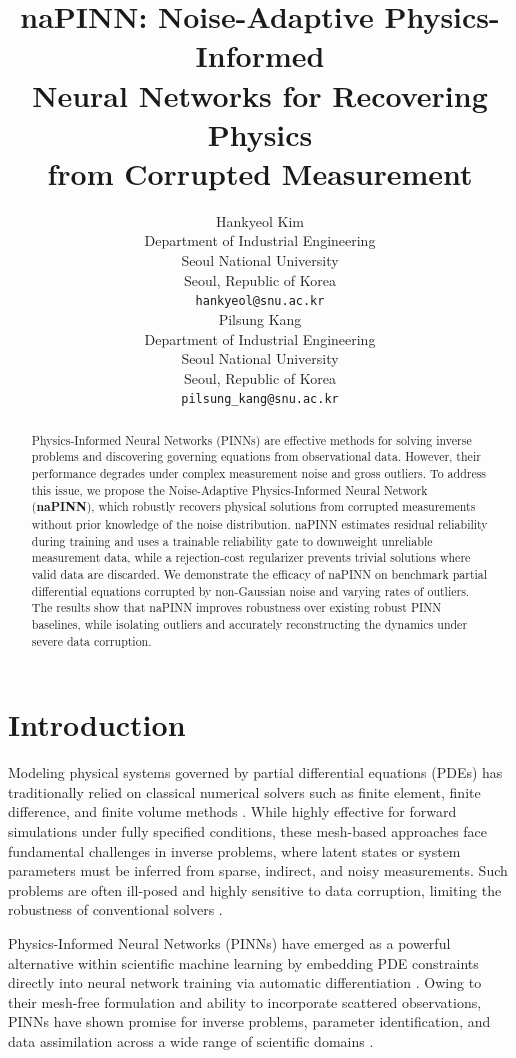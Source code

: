 \documentclass{article}
\title{naPINN: Noise-Adaptive Physics-Informed \\ Neural Networks for Recovering Physics \\ from Corrupted Measurement}
\author{%
  Hankyeol Kim \\
  Department of Industrial Engineering\\
  Seoul National University\\
  Seoul, Republic of Korea \\
  \texttt{hankyeol@snu.ac.kr} \\
  \And
  Pilsung Kang \\
Department of Industrial Engineering\\
  Seoul National University\\
  Seoul, Republic of Korea \\
  \texttt{pilsung_kang@snu.ac.kr} \\
}
\theoremstyle{plain}
\theoremstyle{definition}
\theoremstyle{remark}
\begin{document}
\maketitle

\begin{abstract}
    Physics-Informed Neural Networks (PINNs) are effective methods for solving inverse problems and discovering governing equations from observational data. However, their performance degrades under complex measurement noise and gross outliers. To address this issue, we propose the Noise-Adaptive Physics-Informed Neural Network (\textbf{naPINN}), which robustly recovers physical solutions from corrupted measurements without prior knowledge of the noise distribution. naPINN estimates residual reliability during training and uses a trainable reliability gate to downweight unreliable measurement data, while a rejection-cost regularizer prevents trivial solutions where valid data are discarded. We demonstrate the efficacy of naPINN on benchmark partial differential equations corrupted by non-Gaussian noise and varying rates of outliers. The results show that naPINN improves robustness over existing robust PINN baselines, while isolating outliers and accurately reconstructing the dynamics under severe data corruption.
\end{abstract}

\section{Introduction}
\label{sec:introduction}

Modeling physical systems governed by partial differential equations (PDEs) has traditionally relied on classical numerical solvers such as finite element, finite difference, and finite volume methods \cite{FEM-book, FDM-book}. While highly effective for forward simulations under fully specified conditions, these mesh-based approaches face fundamental challenges in inverse problems, where latent states or system parameters must be inferred from sparse, indirect, and noisy measurements. Such problems are often ill-posed and highly sensitive to data corruption, limiting the robustness of conventional solvers \cite{CptlMethods-Book, StatCom-Book}.

Physics-Informed Neural Networks (PINNs) have emerged as a powerful alternative within scientific machine learning by embedding PDE constraints directly into neural network training via automatic differentiation \cite{Raissi2019, Baydin2018}. Owing to their mesh-free formulation and ability to incorporate scattered observations, PINNs have shown promise for inverse problems, parameter identification, and data assimilation across a wide range of scientific domains \cite{Karniadakis2021}.
\end{document}
